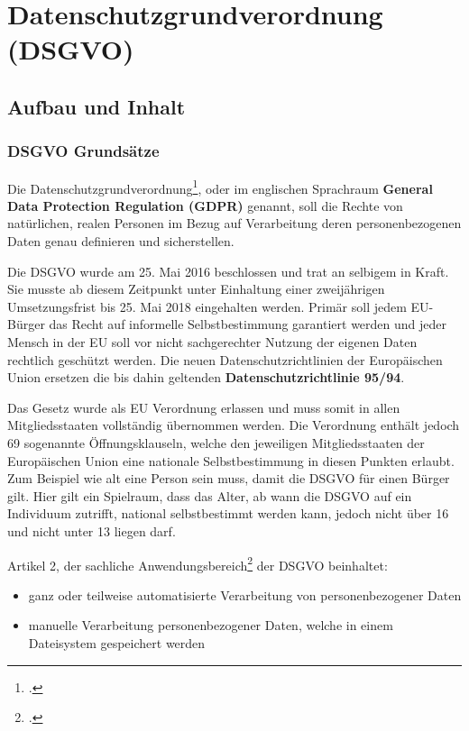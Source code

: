\chapter{Datenschutzgrundverordnung (DSGVO)}
\putz

\section{Aufbau und Inhalt}
\subsection{DSGVO Grundsätze}
Die Datenschutzgrundverordnung\footcite{dsgvo-wiki}, oder im englischen Sprachraum \textbf{General Data Protection Regulation (GDPR)} genannt, soll die Rechte von natürlichen, realen Personen im Bezug auf Verarbeitung deren personenbezogenen Daten genau definieren und sicherstellen.

Die DSGVO wurde am 25. Mai 2016 beschlossen und trat an selbigem in Kraft. Sie musste ab diesem Zeitpunkt unter Einhaltung einer zweijährigen Umsetzungsfrist bis 25. Mai 2018 eingehalten werden. Primär soll jedem EU-Bürger das Recht auf informelle Selbstbestimmung garantiert werden und jeder Mensch in der EU soll vor nicht sachgerechter Nutzung der eigenen Daten rechtlich geschützt werden.
Die neuen Datenschutzrichtlinien der Europäischen Union ersetzen die bis dahin geltenden \textbf{Datenschutzrichtlinie 95/94}.

Das Gesetz wurde als EU Verordnung erlassen und muss somit in allen Mitgliedsstaaten vollständig übernommen werden.
Die Verordnung enthält jedoch 69 sogenannte Öffnungsklauseln, welche den jeweiligen Mitgliedsstaaten der Europäischen Union eine nationale Selbstbestimmung in diesen Punkten erlaubt.
Zum Beispiel wie alt eine Person sein muss, damit die DSGVO für einen Bürger gilt.
Hier gilt ein Spielraum, dass das Alter, ab wann die DSGVO auf ein Individuum zutrifft, national selbstbestimmt werden kann, jedoch nicht über 16 und nicht unter 13 liegen darf.

Artikel 2, der sachliche Anwendungsbereich\footcite{Lehrunterlagen-HTL-cloud} der DSGVO beinhaltet:
\begin{itemize}
	\item ganz oder teilweise automatisierte Verarbeitung von personenbezogener Daten
	\item manuelle Verarbeitung personenbezogener Daten, welche in einem Dateisystem gespeichert werden
\end{itemize}

